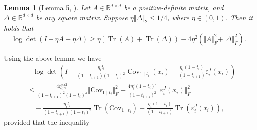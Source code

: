 \documentclass{article}
\theoremstyle{plain}
\newtheorem{lemma}[theorem]{Lemma}
\theoremstyle{definition}
\theoremstyle{remark}
\def\bbR{\mathbb{R}}
\def\Norm#1{\Vert#1\Vert}
\def\Cov{\text{Cov}}
\DeclareMathOperator{\Tr}{Tr}
\begin{document}
\begin{lemma}[Lemma 5, \citet{liang2025low}]
\label{lemma: lower bound on log det}
    Let $A\in \bbR^{d \times d}$ be a positive-definite matrix, and $\Delta \in \bbR^{d \times d}$ be any square matrix. Suppose $\eta \Norm{\Delta}_2 \le 1/4$, where $ \eta \in (0,1)$. Then it holds that 
    \[
    \log \det (I + \eta A + \eta \Delta ) \ge \eta (\Tr(A) + \Tr(\Delta)) - 4 \eta^2 (\Norm{A}_F^2 + \Norm{\Delta}_F^2).
    \]
\end{lemma}
Using the above lemma we have 
\begin{align*}
& - \log \operatorname{det}\left( I+ \frac{\eta_i t_i}{(1-t_{i+1}) (1-t_i)^2} \operatorname{Cov}_{1 \mid t_i}\left(x_{i}\right)+ \frac{\eta_i(1-t_i)}{(1-t_{i+1})} \varepsilon_i^{J}\left(x_{i}\right)\right) \\
& \le  \frac{4 \eta_i^2 t_i^2}{(1-t_{i+1})^2 (1-t_i)^4} \Norm{\Cov_{1 \mid t_i}}_F^2 + \frac{4 \eta_i^2 (1-t_i)^2}{(1-t_{i+1})^2} \Norm{\varepsilon_i^J(x_i)}_F^2\\
& \quad - \frac{\eta_i t_i}{(1-t_{i+1}) (1-t_i)^2} \Tr(\Cov_{1 \mid t_i}) - \frac{\eta_i (1-t_i)}{(1-t_{i+1})} \Tr(\varepsilon_i^J(x_i)),
\end{align*}
provided that the inequality
\end{document}
